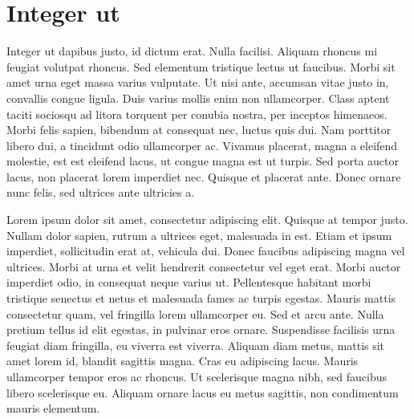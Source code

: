 \chapter{Integer ut}
Integer ut dapibus justo, id dictum erat. Nulla facilisi. Aliquam rhoncus mi feugiat volutpat rhoncus. Sed elementum tristique lectus ut faucibus. Morbi sit amet urna eget massa varius vulputate. Ut nisi ante, accumsan vitae justo in, convallis congue ligula. Duis varius mollis enim non ullamcorper. Class aptent taciti sociosqu ad litora torquent per conubia nostra, per inceptos himenaeos. Morbi felis sapien, bibendum at consequat nec, luctus quis dui. Nam porttitor libero dui, a tincidunt odio ullamcorper ac. Vivamus placerat, magna a eleifend molestie, est est eleifend lacus, ut congue magna est ut turpis. Sed porta auctor lacus, non placerat lorem imperdiet nec. Quisque et placerat ante. Donec ornare nunc felis, sed ultrices ante ultricies a. 

Lorem ipsum dolor sit amet, consectetur adipiscing elit. Quisque at tempor justo. Nullam dolor sapien, rutrum a ultrices eget, malesuada in est. Etiam et ipsum imperdiet, sollicitudin erat at, vehicula dui. Donec faucibus adipiscing magna vel ultrices. Morbi at urna et velit hendrerit consectetur vel eget erat. Morbi auctor imperdiet odio, in consequat neque varius ut. Pellentesque habitant morbi tristique senectus et netus et malesuada fames ac turpis egestas. Mauris mattis consectetur quam, vel fringilla lorem ullamcorper eu. Sed et arcu ante. Nulla pretium tellus id elit egestas, in pulvinar eros ornare. Suspendisse facilisis urna feugiat diam fringilla, eu viverra est viverra. Aliquam diam metus, mattis sit amet lorem id, blandit sagittis magna. Cras eu adipiscing lacus. Mauris ullamcorper tempor eros ac rhoncus. Ut scelerisque magna nibh, sed faucibus libero scelerisque eu. Aliquam ornare lacus eu metus sagittis, non condimentum mauris elementum.
